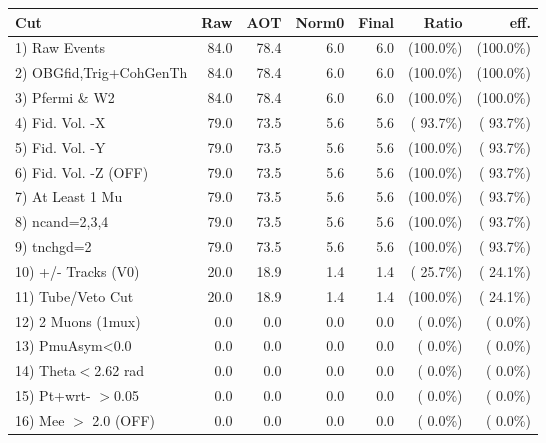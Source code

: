  \begin{table}[h!]\centering
 \begin{tabular}{||l||r|r|r|r|r|r||}
 \hline
 \hline
 Cut & Raw & AOT & Norm0 & Final & Ratio & eff.       \\
 \hline
  1) Raw Events           &         84.0 &         78.4 &          6.0 &          6.0 & (100.0\%) & (100.0\%) \\
  2) OBGfid,Trig+CohGenTh &         84.0 &         78.4 &          6.0 &          6.0 & (100.0\%) & (100.0\%) \\
  3) Pfermi \& W2         &         84.0 &         78.4 &          6.0 &          6.0 & (100.0\%) & (100.0\%) \\
  4) Fid. Vol. -X         &         79.0 &         73.5 &          5.6 &          5.6 & ( 93.7\%) & ( 93.7\%) \\
  5) Fid. Vol. -Y         &         79.0 &         73.5 &          5.6 &          5.6 & (100.0\%) & ( 93.7\%) \\
  6) Fid. Vol. -Z (OFF)   &         79.0 &         73.5 &          5.6 &          5.6 & (100.0\%) & ( 93.7\%) \\
  7) At Least 1 Mu        &         79.0 &         73.5 &          5.6 &          5.6 & (100.0\%) & ( 93.7\%) \\
  8) ncand=2,3,4          &         79.0 &         73.5 &          5.6 &          5.6 & (100.0\%) & ( 93.7\%) \\
  9) tnchgd=2             &         79.0 &         73.5 &          5.6 &          5.6 & (100.0\%) & ( 93.7\%) \\
 10) +/- Tracks (V0)      &         20.0 &         18.9 &          1.4 &          1.4 & ( 25.7\%) & ( 24.1\%) \\
 11) Tube/Veto Cut        &         20.0 &         18.9 &          1.4 &          1.4 & (100.0\%) & ( 24.1\%) \\
 12) 2 Muons (1mux)       &          0.0 &          0.0 &          0.0 &          0.0 & (  0.0\%) & (  0.0\%) \\
 13) PmuAsym<0.0          &          0.0 &          0.0 &          0.0 &          0.0 & (  0.0\%) & (  0.0\%) \\
 14) Theta$<$2.62 rad     &          0.0 &          0.0 &          0.0 &          0.0 & (  0.0\%) & (  0.0\%) \\
 15) Pt+wrt- $>$0.05      &          0.0 &          0.0 &          0.0 &          0.0 & (  0.0\%) & (  0.0\%) \\
 16) Mee $>$ 2.0  (OFF)   &          0.0 &          0.0 &          0.0 &          0.0 & (  0.0\%) & (  0.0\%) \\

\end{tabular}
\end{table}
